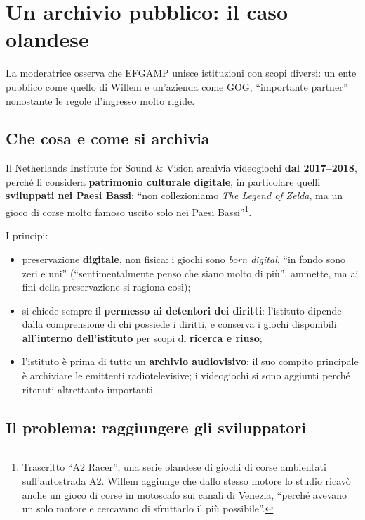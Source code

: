 \section{Un archivio pubblico: il caso olandese}
\label{sec:c1-4-olanda}

La moderatrice osserva che EFGAMP unisce istituzioni con scopi diversi: un ente
pubblico come quello di Willem e un'azienda come GOG, ``importante partner''
nonostante le regole d'ingresso molto rigide.

\subsection{Che cosa e come si archivia}

Il Netherlands Institute for Sound \& Vision archivia videogiochi
\textbf{dal 2017--2018}, perché li considera \textbf{patrimonio culturale
digitale}, in particolare quelli \textbf{sviluppati nei Paesi Bassi}: ``non
collezioniamo \emph{The Legend of Zelda}, ma un gioco di corse molto famoso uscito
solo nei Paesi Bassi''\footnote{Trascritto ``A2 Racer'', una serie olandese di
giochi di corse ambientati sull'autostrada A2. Willem aggiunge che dallo stesso
motore lo studio ricavò anche un gioco di corse in motoscafo sui canali di
Venezia, ``perché avevano un solo motore e cercavano di sfruttarlo il più
possibile''.}.

I principi:
\begin{itemize}
  \item preservazione \textbf{digitale}, non fisica: i giochi sono \emph{born
        digital}, ``in fondo sono zeri e uni'' (``sentimentalmente penso che
        siano molto di più'', ammette, ma ai fini della preservazione si
        ragiona così);
  \item si chiede sempre il \textbf{permesso ai detentori dei diritti}: l'istituto
        dipende dalla comprensione di chi possiede i diritti, e conserva i giochi
        disponibili \textbf{all'interno dell'istituto} per scopi di
        \textbf{ricerca e riuso};
  \item l'istituto è prima di tutto un \textbf{archivio audiovisivo}: il suo
        compito principale è archiviare le emittenti radiotelevisive; i
        videogiochi si sono aggiunti perché ritenuti altrettanto importanti.
\end{itemize}

\subsection{Il problema: raggiungere gli sviluppatori}

